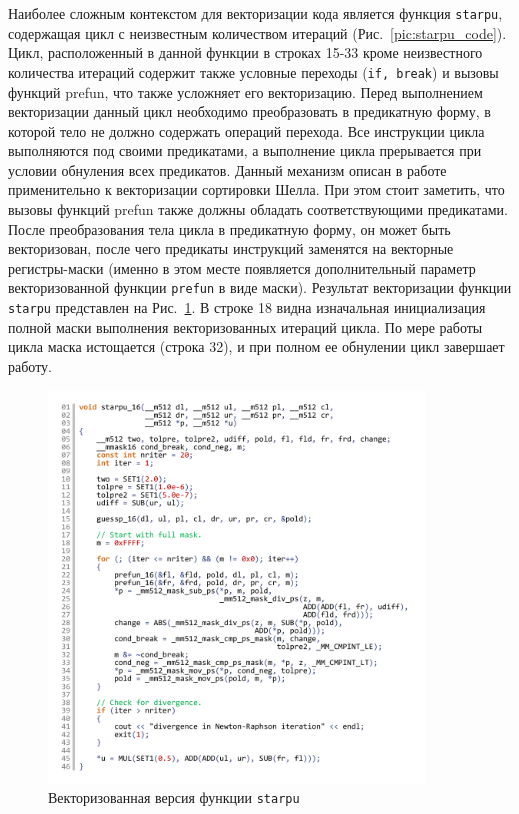\documentclass[utf8]{psta}
\begin{document}
Наиболее сложным контекстом для векторизации кода является функция \texttt{starpu}, содержащая цикл с неизвестным количеством итераций (Рис.~\ref{pic:starpu_code}).
Цикл, расположенный в данной функции в строках 15-33 кроме неизвестного количества итераций содержит также условные переходы (\texttt{if, break}) и вызовы функций prefun, что также усложняет его векторизацию.
Перед выполнением векторизации данный цикл необходимо преобразовать в предикатную форму, в которой тело не должно содержать операций перехода.
Все инструкции цикла выполняются под своими предикатами, а выполнение цикла прерывается при условии обнуления всех предикатов.
Данный механизм описан в работе \cite{RybTelShabLoopsVect} применительно к векторизации сортировки Шелла.
При этом стоит заметить, что вызовы функций prefun также должны обладать соответствующими предикатами.
После преобразования тела цикла в предикатную форму, он может быть векторизован, после чего предикаты инструкций заменятся на векторные регистры-маски (именно в этом месте появляется дополнительный параметр векторизованной функции \texttt{prefun} в виде маски).
Результат векторизации функции \texttt{starpu} представлен на Рис.~\ref{pic:starpu_16_code}.
В строке 18 видна изначальная инициализация полной маски выполнения векторизованных итераций цикла. По мере работы цикла маска истощается (строка 32), и при полном ее обнулении цикл завершает работу.

\begin{figure}
\includegraphics[width=10cm]{pics/pic_starpu_16_code}
\caption{Векторизованная версия функции \texttt{starpu}}
\label{pic:starpu_16_code}
\end{figure}
\end{document}
